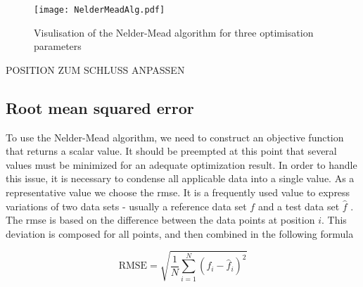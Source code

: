 


 



\begin{figure}[H]
    \centering
    \texttt{[image: NelderMeadAlg.pdf]}
    \caption{Visulisation of the Nelder-Mead algorithm for three optimisation parameters }
    \label{fig:nelderMead}
\end{figure}

POSITION ZUM SCHLUSS ANPASSEN

\subsection{Root mean squared error} \label{subsec: RMSE}
To use the Nelder-Mead algorithm, we need to construct an objective function that returns a scalar value. It should be preempted at this point that several values must be minimized for an adequate optimization result. In order to handle this issue, it is necessary to condense all applicable data into a single value. As a representative value we choose the \acrfull{rmse}. It is a frequently used value to express variations of two data sets - usually a reference data set $f$ and a test data set $\hat{f}$ \cite{morrow_method_2010}. The \acrshort{rmse} is based on the difference between the data points at position $i$. This deviation is composed for all points, and then combined in the following formula

\begin{equation} \label{eq: RMSE}
    \text{RMSE} = \sqrt{\frac{1}{N}\sum_{i=1}^{N} (f_i - \hat{f}_i)^2}
\end{equation}

